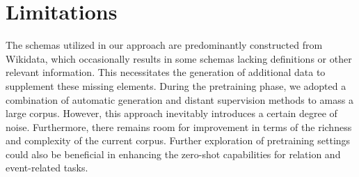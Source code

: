 \section*{Limitations}
The schemas utilized in our approach are predominantly constructed from Wikidata, which occasionally results in some schemas lacking definitions or other relevant information. This necessitates the generation of additional data to supplement these missing elements. During the pretraining phase, we adopted a combination of automatic generation and distant supervision methods to amass a large corpus. However, this approach inevitably introduces a certain degree of noise. Furthermore, there remains room for improvement in terms of the richness and complexity of the current corpus. Further exploration of pretraining settings could also be beneficial in enhancing the zero-shot capabilities for relation and event-related tasks.

